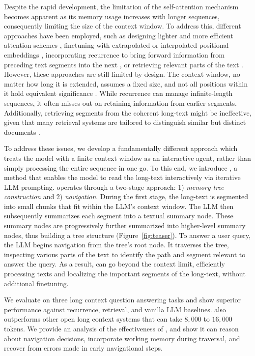 Despite the rapid development, the limitation of the self-attention mechanism becomes apparent as its memory usage increases with longer sequences, consequently limiting the size of the context window. To address this, different approaches have been employed, such as designing lighter and more efficient attention schemes \citep{zaheer2020bigbird}, finetuning with extrapolated or interpolated positional embeddings \citep{press2022train, chen2023extending}, incorporating recurrence to bring forward information from preceding text segments into the next \citep{rae2019compressive,fan2020feedback,xu2022beyond}, or retrieving relevant parts of the text \citep{lewis2020retrieval,izacard2021leveraging}. However, these approaches are still limited by design. The context window, no matter how long it is extended, assumes a fixed size, and not all positions within it hold equivalent significance \citep{liu2023lost}. While recurrence can manage infinite-length sequences, it often misses out on retaining information from earlier segments.  Additionally, retrieving segments from the coherent long-text might be ineffective, given that many retrieval systems are tailored to distinguish similar but distinct documents \citep{chen2017reading}.

To address these issues, we develop a fundamentally different approach which
treats the model with a finite context window as an interactive agent, rather than simply processing the entire sequence in one go. To this end, we introduce \sysname{}, a method that enables the model to read the long-text interactively via iterative LLM prompting. \sysname{} operates through a two-stage approach: 1) \textit{memory tree construction} and 2) \textit{navigation}. During the first stage, the long-text is segmented into small chunks that fit within the LLM's context window. The LLM then subsequently summarizes each segment into a textual summary node. These summary nodes are progressively further summarized into higher-level summary nodes, thus building a tree structure (Figure~\ref{fig:teaser}). To answer a user query, the LLM begins navigation from the tree's root node. It traverses the tree, inspecting various parts of the text to identify the path and segment relevant to answer the query. As a result, \sysname{} can go beyond the context limit, efficiently processing texts and localizing the important segments of the long-text,  without additional finetuning.

We evaluate \sysname{} on three long context question answering tasks and show superior performance against recurrence, retrieval, and %
vanilla LLM baselines. \sysname{} also outperforms other open long context systems that can take $8,000$ to $16,000$ tokens. We provide an analysis of the effectiveness of  %
\sysname{},  and show it can
reason about navigation decisions, incorporate working memory during traversal, and
recover from errors made in early navigational steps.

